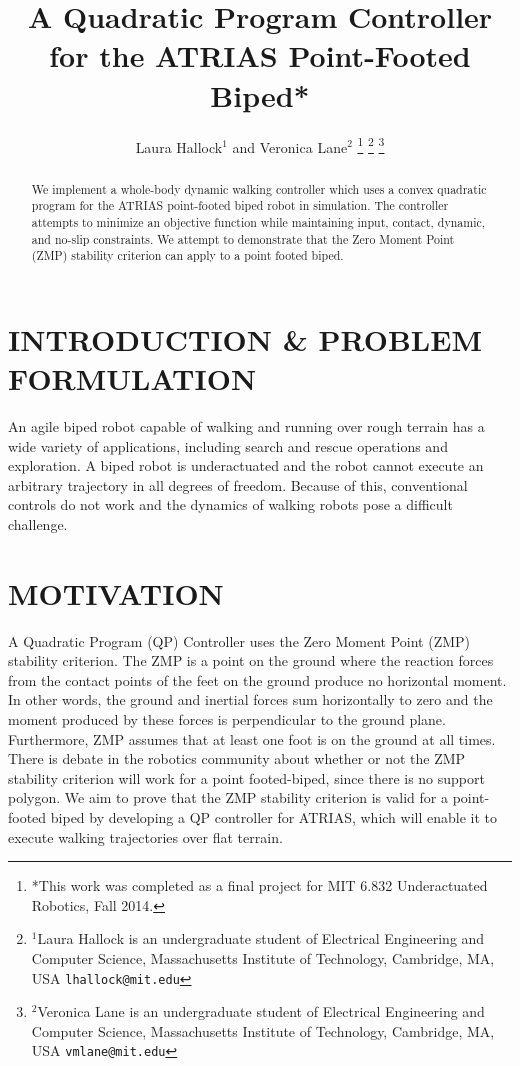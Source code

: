 \documentclass[letterpaper, 10 pt, conference]{ieeeconf}  %
\title{\LARGE \bf
A Quadratic Program Controller for the ATRIAS Point-Footed Biped*
}
\author{Laura Hallock$^{1}$ and Veronica Lane$^{2}$%
\thanks{*This work was completed as a final project for MIT 6.832 Underactuated Robotics, Fall 2014.}%
\thanks{$^{1}$Laura Hallock is an undergraduate student of Electrical Engineering and Computer Science,
        Massachusetts Institute of Technology, Cambridge, MA, USA
        {\tt\small lhallock@mit.edu}}%
\thanks{$^{2}$Veronica Lane is an undergraduate student of Electrical Engineering and Computer Science,
        Massachusetts Institute of Technology, Cambridge, MA, USA
        {\tt\small vmlane@mit.edu}}%
}
\begin{document}
\maketitle
\thispagestyle{empty}
\pagestyle{empty}


\begin{abstract}

We implement a whole-body dynamic walking controller which uses a convex quadratic program for the ATRIAS point-footed biped robot in simulation. The controller attempts to minimize an objective function while maintaining input, contact, dynamic, and no-slip constraints. We attempt to demonstrate that the Zero Moment Point (ZMP) stability criterion can apply to a point footed biped.

\end{abstract}


\section{INTRODUCTION \& PROBLEM FORMULATION}

An agile biped robot capable of walking and running over rough terrain has a wide variety of applications, including search and rescue operations and exploration. A biped robot is underactuated and the robot cannot execute an arbitrary trajectory in all degrees of freedom. Because of this, conventional controls do not work and the dynamics of walking robots pose a difficult challenge.

\section{MOTIVATION}

A Quadratic Program (QP) Controller uses the Zero Moment Point (ZMP) stability criterion.  The ZMP is a point on the ground where the reaction forces from the contact points of the feet on the ground produce no horizontal moment. In other words, the ground and inertial forces sum horizontally to zero and the moment produced by these forces is perpendicular to the ground plane. Furthermore, ZMP assumes that at least one foot is on the ground at all times. There is debate in the robotics community about whether or not the ZMP stability criterion will work for a point footed-biped, since there is no support polygon. We aim to prove that the ZMP stability criterion is valid for a point-footed biped by developing a QP controller for ATRIAS, which will enable it to execute walking trajectories over flat terrain.
\end{document}
